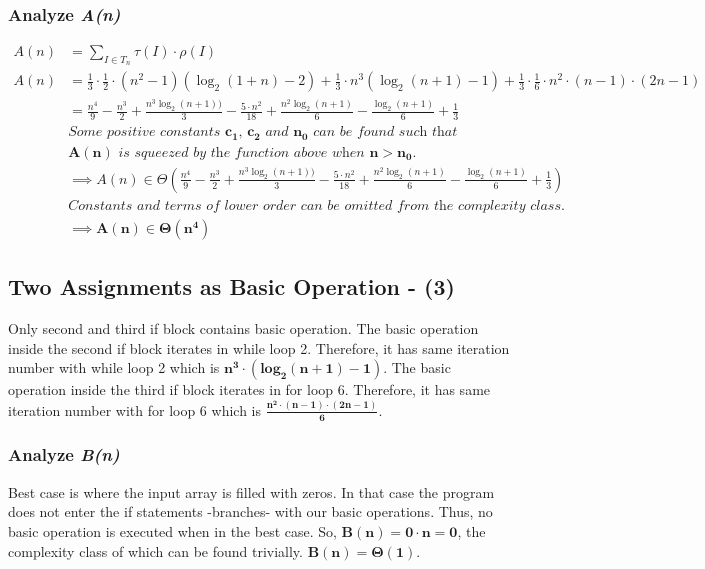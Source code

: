 \documentclass[10pt]{article}
\begin{document}
\subsubsection{Analyze \textit{A(n)}}
\begin{align*}
A(n) &= \displaystyle\sum _{I \in T_{n}} \tau (I) \cdot \rho (I) \\
A(n) &= \frac{1}{3} \cdot \frac{1}{2} \cdot (n^2 - 1) (\log_{2}(1 + n) - 2) + \frac{1}{3} \cdot n^3 (\log_2(n+1) - 1) + \frac{1}{3} \cdot \frac{1} {6} \cdot n^2\cdot (n-1) \cdot (2n-1) \\
&= \frac{n^4}{9} - \frac{n^3}{2} + \frac{n^{3} \log_{2}(n + 1))}{3} - \frac{5 \cdot n^2}{18} + \frac{n^2 \log_{2}(n + 1)}{6} - \frac{\log_{2}(n + 1)}{6} + \frac{1}{3} \\
&\textit{Some positive constants $\mathbf{c_{1}}$, $\mathbf{c_{2}}$ and $\mathbf{n_{0}}$ can be found such that} \\ 
&\textit{$\mathbf{A(n)}$ is squeezed by the function above when $\mathbf{n > n_{0}}$.} \\
&\implies A(n) \in \Theta (\frac{n^4}{9} - \frac{n^3}{2} + \frac{n^{3} \log_{2}(n + 1))}{3} - \frac{5 \cdot n^2}{18} + \frac{n^2 \log_{2}(n + 1)}{6} - \frac{\log_{2}(n + 1)}{6} + \frac{1}{3}) \\
&\textit{Constants and terms of lower order can be omitted from the complexity class.} \\
&\implies \mathbf{A(n) \boldsymbol{\in} \Theta(n^{4})}
\end{align*}


\subsection{Two Assignments as Basic Operation - (3)}
Only second and third if block contains basic operation. The basic operation inside the second if block iterates in while loop 2. Therefore, it has same iteration number with while loop 2 which is $\mathbf{ n^3 \cdot (log_2(n+1) - 1)}$. The basic operation inside the third if block iterates in for loop 6. Therefore, it has same iteration number with for loop 6 which is  $\mathbf{\frac{ n^2\cdot (n-1) \cdot (2n-1) } {6}}$.   

\subsubsection{Analyze \textit{B(n)}}
Best case is where the input array is filled with zeros. In that case the program does not enter the if statements -branches- with our basic operations. Thus, no basic operation is executed when in the best case. So, $\mathbf{B(n) = 0 \cdot n = 0}$, the complexity class of which can be found trivially. $\mathbf{B(n) = \Theta(1)}$.
\end{document}
